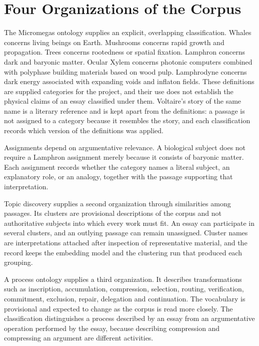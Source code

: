 \documentclass[11pt]{article}
\begin{document}
\section{Four Organizations of the Corpus}

The Micromegas ontology supplies an explicit, overlapping classification. Whales concerns living beings on Earth. Mushrooms concerns rapid growth and propagation. Trees concerns rootedness or spatial fixation. Lamphron concerns dark and baryonic matter. Ocular Xylem concerns photonic computers combined with polyphase building materials based on wood pulp. Lamphrodyne concerns dark energy associated with expanding voids and inflaton fields. These definitions are supplied categories for the project, and their use does not establish the physical claims of an essay classified under them. Voltaire's story of the same name is a literary reference and is kept apart from the definitions: a passage is not assigned to a category because it resembles the story, and each classification records which version of the definitions was applied.

Assignments depend on argumentative relevance. A biological subject does not require a Lamphron assignment merely because it consists of baryonic matter. Each assignment records whether the category names a literal subject, an explanatory role, or an analogy, together with the passage supporting that interpretation.

Topic discovery supplies a second organization through similarities among passages. Its clusters are provisional descriptions of the corpus and not authoritative subjects into which every work must fit. An essay can participate in several clusters, and an outlying passage can remain unassigned. Cluster names are interpretations attached after inspection of representative material, and the record keeps the embedding model and the clustering run that produced each grouping.

A process ontology supplies a third organization. It describes transformations such as inscription, accumulation, compression, selection, routing, verification, commitment, exclusion, repair, delegation and continuation. The vocabulary is provisional and expected to change as the corpus is read more closely. The classification distinguishes a process described by an essay from an argumentative operation performed by the essay, because describing compression and compressing an argument are different activities.
\end{document}
